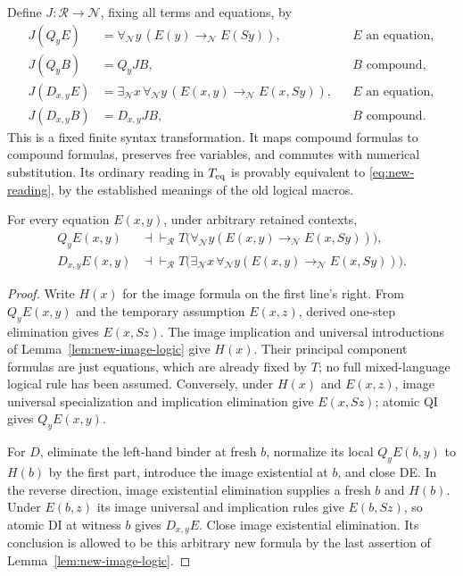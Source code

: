 Define $J:\mathcal R\to\mathcal N$, fixing all terms and equations, by
\begin{equation}
 \begin{aligned}
 J(Q_yE)&=\forall_{\mathcal N}y\,
                (E(y)\to_{\mathcal N}E(Sy)),
                    &&E\text{ an equation},\\
 J(Q_yB)&=Q_yJB,     &&B\text{ compound},\\
 J(D_{x,y}E)&=\exists_{\mathcal N}x\,
             \forall_{\mathcal N}y\,
                (E(x,y)\to_{\mathcal N}E(x,Sy)),
                    &&E\text{ an equation},\\
 J(D_{x,y}B)&=D_{x,y}JB,&&B\text{ compound}.
 \end{aligned}
 \label{eq:new-J}
\end{equation}
This is a fixed finite syntax transformation.  It maps compound formulas to
compound formulas, preserves free variables, and commutes with numerical
substitution.  Its ordinary reading in $T_{\rm eq}$ is provably equivalent to
\eqref{eq:new-reading}, by the established meanings of the old logical macros.

\begin{lemma}
\label{lem:new-atomic-normalization}
For every equation $E(x,y)$, under arbitrary retained contexts,
\begin{equation}
 \begin{aligned}
 Q_yE(x,y)&\dashv\vdash_{\mathcal R}
       T\bigl(\forall_{\mathcal N}y
           (E(x,y)\to_{\mathcal N}E(x,Sy))\bigr),\\
 D_{x,y}E(x,y)&\dashv\vdash_{\mathcal R}
       T\bigl(\exists_{\mathcal N}x\,
             \forall_{\mathcal N}y
           (E(x,y)\to_{\mathcal N}E(x,Sy))\bigr).
 \end{aligned}
 \label{eq:new-atomic-normalization}
\end{equation}
\end{lemma}
\begin{proof}
Write $H(x)$ for the image formula on the first line's right.
From $Q_yE(x,y)$ and the temporary assumption $E(x,z)$, derived one-step
elimination gives $E(x,Sz)$.  The image implication and universal
introductions of Lemma~\ref{lem:new-image-logic} give $H(x)$.  Their
principal component formulas are just equations, which are already fixed
by $T$; no full mixed-language logical rule has been assumed.
Conversely, under $H(x)$ and $E(x,z)$, image universal specialization and
implication elimination give $E(x,Sz)$; atomic QI gives $Q_yE(x,y)$.

For $D$, eliminate the left-hand binder at fresh $b$, normalize its local
$Q_yE(b,y)$ to $H(b)$ by the first part, introduce the image existential
at $b$, and close DE.  In the reverse direction, image existential
elimination supplies a fresh $b$ and $H(b)$.  Under $E(b,z)$ its image
universal and implication rules give $E(b,Sz)$, so atomic DI at witness
$b$ gives $D_{x,y}E$.  Close image existential elimination.  Its conclusion
is allowed to be this arbitrary new formula by the last assertion of
Lemma~\ref{lem:new-image-logic}.
\end{proof}


